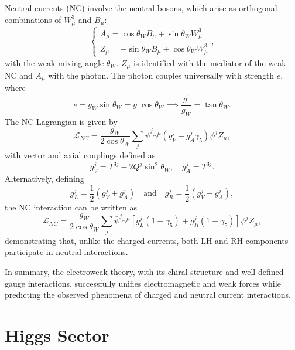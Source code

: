 Neutral currents (NC) involve the neutral bosons, which arise as orthogonal combinations of $W_\mu^3$ and $B_\mu$:
\begin{equation}
\begin{cases}
      A_\mu = \cos \theta_W B_\mu + \sin \theta_W W_\mu^3 \\
      Z_\mu = -\sin \theta_W B_\mu + \cos \theta_W W_\mu^3
    \end{cases},
\end{equation}
with the weak mixing angle $\theta_W$. $Z_\mu$ is identified with the mediator of the weak NC and $A_\mu$ with the photon. The photon couples universally with strength $e$, where
\begin{equation}
e=g_W\sin \theta_W=g^\prime \cos \theta_W \implies \frac{g^\prime}{g_W}= \tan \theta_W.
\end{equation}
The NC Lagrangian is given by
\begin{equation}
\mathcal{L}_{NC}= \frac{g_W}{2 \cos \theta_W} \sum_j \bar{\psi}^j \gamma^\mu \left( g_V^j - g_A^j \gamma_5\right) \psi^j Z_\mu,
\end{equation}
with vector and axial couplings defined as
\begin{equation}
g_V^j = T^{3j}-2Q^j \sin^2\theta_W, \quad g_A^j = T^{3j}.
\end{equation}
Alternatively, defining
\begin{equation}
g_L^j = \frac{1}{2}(g_V^j+g_A^j) \quad \mathrm{and} \quad g_R^j=\frac{1}{2}(g_V^j-g_A^j),
\end{equation}
the NC interaction can be written as
\begin{equation}
\mathcal{L}_{NC}=\frac{g_W}{2 \cos \theta_W} \sum_j \bar{\psi}^j \gamma^\mu \left[ g_L^j (1-\gamma_5) + g_R^j(1+\gamma_5)\right] \psi^j Z_\mu,
\end{equation}
demonstrating that, unlike the charged currents, both LH and RH components participate in neutral interactions.

In summary, the electroweak theory, with its chiral structure and well-defined gauge interactions, successfully unifies electromagnetic and weak forces while predicting the observed phenomena of charged and neutral current interactions.


\section{Higgs Sector}


